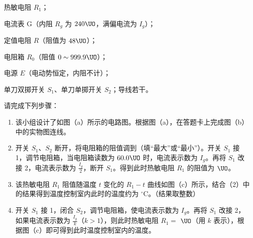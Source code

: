 \documentclass[\gkver]{gaokaozhenti}
\begin{document}
\begin{enumerate}
热敏电阻 $R_{1}$；

电流表 G（内阻 $R_{g}$ 为 $240 \UO$，满偏电流为 $I_{g}$）；

定值电阻 $R$（阻值为 $48 \UO$）；

电阻箱 $R_{0}$（阻值 $0 \sim 999.9 \UO$）；

电源 $E$（电动势恒定，内阻不计）；

单刀双掷开关 $S_{1}$、单刀单掷开关 $S_{2}$；导线若干。

请完成下列步骤：
\begin{enumerate}
	\item
	该小组设计了如图（a）所示的电路图。根据图（a），在答题卡上完成图（b）中的实物图连线。
	\item
	开关 $S_{1}$、$S_{2}$ 断开，将电阻箱的阻值调到（填“最大”或“最小”）。开关 $S_{1}$ 接 1，调节电阻箱，当电阻箱读数为 $60.0 \UO$ 时，电流表示数为 $I_{g}$。再将 $S_{1}$ 改接 2，电流表示数为 $\frac{I_{g}}{2}$，断开 $S_{1}$。得到此时热敏电阻 $R_{1}$ 的阻值为 $\UO$。
	\item
	该热敏电阻 $R_{1}$ 阻值随温度 $t$ 变化的 $R_{1} - t$ 曲线如图（c）所示，结合（2）中的结果得到温度控制室内此时的温度约为 ${}^{\circ}\mathrm{C}$。（结果取整数）
	\item
	开关 $S_{1}$ 接 1，闭合 $S_{2}$，调节电阻箱，使电流表示数为 $I_{g}$。再将 $S_{1}$ 改接 2，如果电流表示数为 $\frac{I_{g}}{k}$（$k > 1$），则此时热敏电阻 $R_{1} = $ $\UO$（用 $k$ 表示），根据图（c）即可得到此时温度控制室内的温度。
\end{enumerate}

\end{enumerate}
\end{document}
